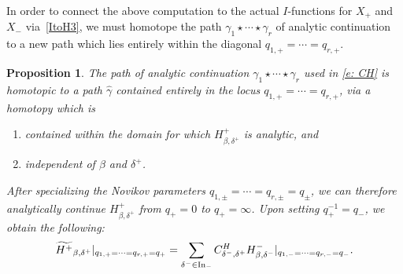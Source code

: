 \documentclass[pdftex]{sigma}
\newtheorem{Proposition}[Theorem]{Proposition}
 { \theoremstyle{definition}
\newtheorem{Definition}[Theorem]{Definition}
\newtheorem{Note}[Theorem]{Note}
\newtheorem{Example}[Theorem]{Example}
\newtheorem{Remark}[Theorem]{Remark} }
\numberwithin{equation}{section}
\begin{document}
In order to connect the above computation to the actual $I$-functions for $X_+$ and $X_-$ via~\eqref{ItoH3}, we must homotope the path $\gamma_1 \star \cdots \star \gamma_r$ of analytic continuation to a new path which lies entirely within the diagonal $q_{1, +} = \cdots =q_{r, +}$.
\begin{Proposition}\label{p:ancon}
The path of analytic continuation $\gamma_1 \star \cdots \star \gamma_r$ used in \eqref{e: CH} is homotopic to a path $\hat \gamma$ contained entirely in the locus $q_{1, +} = \cdots = q_{r, +}$, via a homotopy which is
\begin{enumerate}\itemsep=0pt
\item[$1)$] contained within the domain for which ${H^{+}_{\beta, \delta^+}}$ is analytic, and
\item[$2)$] independent of $\beta$ and $\delta^+$.
\end{enumerate}
After specializing the Novikov parameters $q_{1, \pm} = \cdots = q_{r, \pm} = q_\pm$, we can therefore analytically continue $H^{+}_{\beta, \delta^+}$ from $q_+ = 0$ to $q_+ = \infty$. Upon setting $q_+^{-1} = q_-$, we obtain the following:
\begin{equation}\label{e: CHspecial} \widetilde{H^{+}}_{\beta, \delta^+}|_{q_{1, +} = \cdots =q_{r, +} = q_+} = \sum_{\delta^- \in {\rm In}_-} C^H_{\delta^-, \delta^+} H^{-}_{\beta, \delta^-}|_{q_{1, -} = \cdots = q_{r, -} = q_-}.\end{equation}
\end{Proposition}
\end{document}
